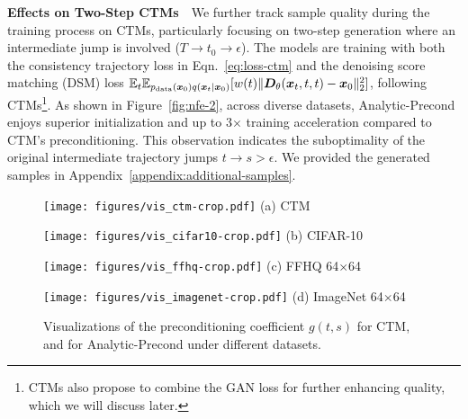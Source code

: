 \textbf{Effects on Two-Step CTMs}$\mbox{ }$ We further track sample quality during the training process on CTMs, particularly focusing on two-step generation where an intermediate jump is involved ($T\rightarrow t_0\rightarrow\epsilon$). The models are training with both the consistency trajectory loss in Eqn.~\eqref{eq:loss-ctm} and the denoising score matching (DSM) loss $\mathbb{E}_t\mathbb{E}_{p_{\text{data}}(\bm{x}_0)q(\bm{x}_t|\bm{x}_0)}[w(t)\|\bm{D}_\theta(\bm{x}_t,t,t)-\bm{x}_0\|_2^2]$, following CTMs\footnote{CTMs also propose to combine the GAN loss for further enhancing quality, which we will discuss later.}. As 
shown in Figure~\ref{fig:nfe-2}, across diverse datasets, Analytic-Precond enjoys superior initialization and up to 3$\times$ training acceleration compared to CTM's preconditioning. This observation indicates the suboptimality of the original intermediate trajectory jumps $t\rightarrow s>\epsilon$. We provided the generated samples in Appendix~\ref{appendix:additional-samples}.
\begin{figure}[t]
    \centering
	\begin{minipage}[t]{.24\linewidth}
		\centering
		\texttt{[image: figures/vis\_ctm-crop.pdf]}
		\small{(a) CTM}
	\end{minipage}
	\begin{minipage}[t]{.24\linewidth}
		\centering
		\texttt{[image: figures/vis\_cifar10-crop.pdf]}
		\small{(b) CIFAR-10}
	\end{minipage}
        \begin{minipage}[t]{.24\linewidth}
		\centering
		\texttt{[image: figures/vis\_ffhq-crop.pdf]}
		\small{(c) FFHQ 64$\times$64}
	\end{minipage}
	\begin{minipage}[t]{.24\linewidth}
		\centering
		\texttt{[image: figures/vis\_imagenet-crop.pdf]}
		\small{(d) ImageNet 64$\times$64}
	\end{minipage}
	\caption{\label{fig:visualization}Visualizations of the preconditioning coefficient $g(t,s)$ for CTM, and for Analytic-Precond under different datasets.}
	\vspace{-.1in}
\end{figure}
